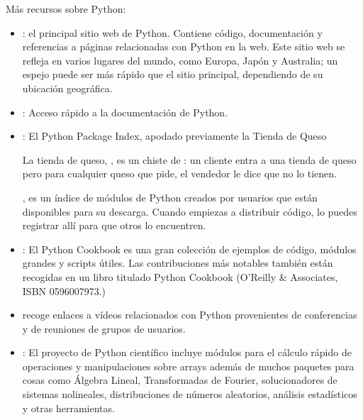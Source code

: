 \documentclass[a4,10pt,spanish]{sphinxmanual}
\begin{document}
\sphinxAtStartPar
Más recursos sobre Python:
\begin{itemize}
\item {} 
\sphinxAtStartPar
{}: el principal sitio web de Python. Contiene código, documentación y referencias a páginas relacionadas con Python en la web. Este sitio web se refleja en varios lugares del mundo, como Europa, Japón y Australia; un espejo puede ser más rápido que el sitio principal, dependiendo de su ubicación geográfica.

\item {} 
\sphinxAtStartPar
{}:  Acceso rápido a la documentación de Python.

\item {} 
\sphinxAtStartPar
{}: El Python Package Index, apodado previamente la Tienda de Queso %
\begin{footnote}[1]\sphinxAtStartFootnote
La tienda de queso, , es un chiste de : un cliente entra a una tienda de queso pero para cualquier queso que pide, el vendedor le dice que no lo tienen.
%
\end{footnote}, es un índice de módulos de Python creados por usuarios que están disponibles para su descarga. Cuando empiezas a distribuir código, lo puedes registrar allí para que otros lo encuentren.

\item {} 
\sphinxAtStartPar
{}: El Python Cookbook es una gran colección de ejemplos de código, módulos grandes y scripts útiles. Las contribuciones más notables también están recogidas en un libro titulado Python Cookbook (O’Reilly \& Associates, ISBN 0\sphinxhyphen{}596\sphinxhyphen{}00797\sphinxhyphen{}3.)

\item {} 
\sphinxAtStartPar
{} recoge enlaces a vídeos relacionados con Python provenientes de conferencias y de reuniones de grupos de usuarios.

\item {} 
\sphinxAtStartPar
{}: El proyecto de Python científico incluye módulos para el cálculo rápido de operaciones y manipulaciones sobre arrays además de muchos paquetes para cosas como Álgebra Lineal, Transformadas de Fourier, solucionadores de sistemas no\sphinxhyphen{}lineales, distribuciones de números aleatorios, análisis estadísticos y otras herramientas.

\end{itemize}
\end{document}
